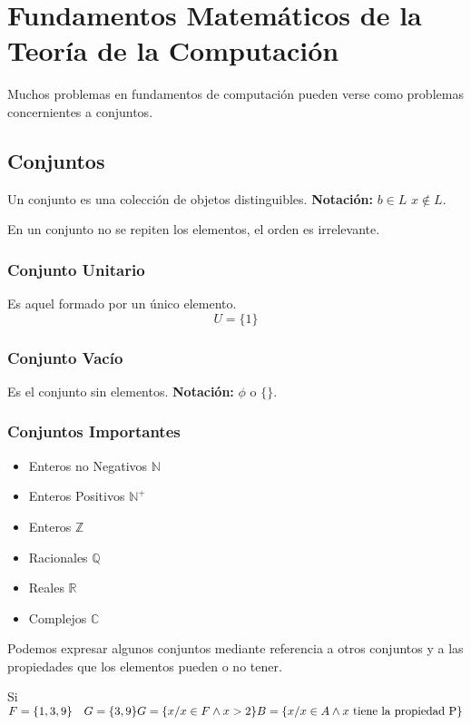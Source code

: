 \chapter{Fundamentos Matemáticos de la Teoría de la Computación}

Muchos problemas en fundamentos de computación pueden verse como problemas concernientes a conjuntos.

\section{Conjuntos}

Un conjunto es una colección de objetos distinguibles.
\textbf{Notación: }$b\in L$ $x\not\in L$.

En un conjunto no se repiten los elementos, el orden es irrelevante.

\subsection{Conjunto Unitario}
Es aquel formado por un único elemento.
$$U=\lbrace 1 \rbrace$$
\subsection{Conjunto Vacío}
Es el conjunto sin elementos.
\textbf{Notación: }$\phi$ o $\lbrace \rbrace$.
\subsection{Conjuntos Importantes}
\begin{itemize}
\item Enteros no Negativos $\mathds{N}$
\item Enteros Positivos $\mathds{N}^{+}$
\item Enteros $\mathds{Z}$
\item Racionales $\mathds{Q}$
\item Reales $\mathds{R}$
\item Complejos $\mathds{C}$
\end{itemize}

Podemos expresar algunos conjuntos mediante referencia a otros conjuntos y a las propiedades que los elementos pueden o no tener.

Si $F=\lbrace 1,3,9 \rbrace \quad G=\lbrace 3,9\rbrace \\ G=\lbrace x/ x \in F \land x>2\rbrace \\ B=\lbrace x/x \in A \land x \mbox{ tiene la propiedad P}\rbrace$

